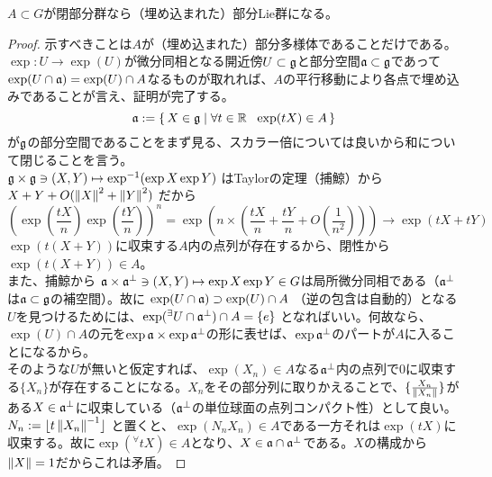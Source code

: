 \begin{thm}
    $A\subset G$が閉部分群なら（埋め込まれた）部分Lie群になる。
\end{thm}
\begin{proof}
    示すべきことは$A$が（埋め込まれた）部分多様体であることだけである。$\exp:U\to\exp(U)$が微分同相となる開近傍$U\subset\mathfrak{g}$と部分空間$\mathfrak{a}\subset\mathfrak{g}$であって$\exp(U\cap\mathfrak{a})=\exp(U)\cap A$なるものが取れれば、$A$の平行移動により各点で埋め込みであることが言え、証明が完了する。
    \[\a:=\set{X\in\g}{\forall t\in\R\ \ \exp(tX)\in A}\]
    が$\mathfrak{g}$の部分空間であることをまず見る、スカラー倍については良いから和について閉じることを言う。\\
    $\mathfrak{g}\times\mathfrak{g}\ni(X,Y)\mapsto\exp^{-1}(\exp X\exp Y)$ はTaylorの定理（捕鯨）から$X+Y+O(\left\lVert X\right\rVert^2+\left\lVert Y\right\rVert^2)$ だから
    \[\left(\exp\left(\frac{tX}{n}\right)\exp\left(\frac{tY}{n}\right)\right)^n=\exp\left(n\times\left(\frac{tX}{n}+\frac{tY}{n}+O\left(\frac1{n^2}\right)\right)\right)\to\exp(tX+tY)\]
    $\exp(t(X+Y))$に収束する$A$内の点列が存在するから、閉性から$\exp(t(X+Y))\in A$。\\
    また、捕鯨から $\mathfrak{a}\times\mathfrak{a}^\perp\ni(X,Y)\mapsto\exp X\exp Y\in G$は局所微分同相である（$\mathfrak{a}^\perp$は$\mathfrak{a}\subset\mathfrak{g}$の補空間）。故に $\exp(U\cap\mathfrak{a})\supset\exp(U)\cap A$ （逆の包含は自動的）となる$U$を見つけるためには、$\exp({}^\exists U\cap\mathfrak{a}^\perp)\cap A=\{e\}$ となればいい。何故なら、$\exp(U)\cap A$の元を$\exp\mathfrak{a}\times\exp\mathfrak{a}^\perp$の形に表せば、$\exp\mathfrak{a}^\perp$のパートが$A$に入ることになるから。\\
    そのような$U$が無いと仮定すれば、$\exp(X_n)\in A$なる$\mathfrak{a}^\perp$内の点列で0に収束する$\{X_n\}$が存在することになる。$X_n$をその部分列に取りかえることで、$\{\frac{X_n}{\left\lVert X_n\right\rVert}\}$がある$X\in\mathfrak{a}^\perp$に収束している（$\mathfrak{a}^\perp$の単位球面の点列コンパクト性）として良い。$N_n:=\lfloor t\left\lVert X_n\right\rVert^{-1}\rfloor$ と置くと、$\exp(N_nX_n)\in A$である一方それは$\exp(tX)$に収束する。故に$\exp({}^\forall tX)\in A$となり、$X\in\mathfrak{a}\cap\mathfrak{a}^\perp$である。$X$の構成から$\left\lVert X\right\rVert=1$だからこれは矛盾。
\end{proof}


\ \\
